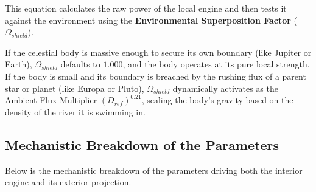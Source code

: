 \documentclass[11pt, a4paper]{article}
\begin{document}
  This equation calculates the raw power of the local engine and then tests it against the environment using the \textbf{Environmental Superposition Factor} ($\Omega_{shield}$). 
  
  If the celestial body is massive enough to secure its own boundary (like Jupiter or Earth), $\Omega_{shield}$ defaults to $1.000$, and the body operates at its pure local strength. If the body is small and its boundary is breached by the rushing flux of a parent star or planet (like Europa or Pluto), $\Omega_{shield}$ dynamically activates as the Ambient Flux Multiplier $(D_{ref})^{0.21}$, scaling the body's gravity based on the density of the river it is swimming in.

\vspace{1.5em}
\subsection{Mechanistic Breakdown of the Parameters}
  Below is the mechanistic breakdown of the parameters driving both the interior engine and its exterior projection. 
\end{document}
